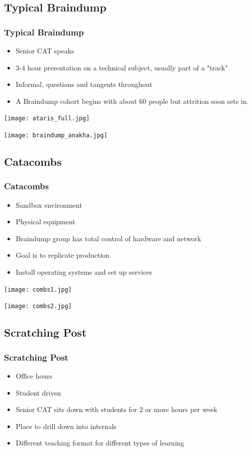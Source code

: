 \documentclass{beamer}
\begin{document}
\subsection{Typical Braindump}
\frame
{
    \frametitle{Typical Braindump}
    \begin{itemize}
        \item Senior CAT speaks
        \item 3-4 hour presentation on a technical subject, usually part of a "track"
        \item Informal, questions and tangents throughout
        \item A Braindump cohort begins with about 60 people but attrition soon sets in.
    \end{itemize}
}

\frame
{
        \texttt{[image: ataris\_full.jpg]}
}

\frame
{
        \texttt{[image: braindump\_anakha.jpg]}
}

\subsection{Catacombs}
\frame
{
    \frametitle{Catacombs}
    \begin{itemize}
        \item Sandbox environment
        \item Physical equipment
        \item Braindump group has total control of hardware and network
        \item Goal is to replicate production
        \item Install operating systems and set up services
    \end{itemize}
}

\frame
{
        \texttt{[image: combs1.jpg]}
}

\frame
{
        \texttt{[image: combs2.jpg]}
}


\subsection{Scratching Post}
\frame
{
    \frametitle{Scratching Post}
    \begin{itemize}
        \item Office hours
        \item Student driven
        \item Senior CAT sits down with students for 2 or more hours per week
        \item Place to drill down into internals
        \item Different teaching format for different types of learning
    \end{itemize}
}
\end{document}
